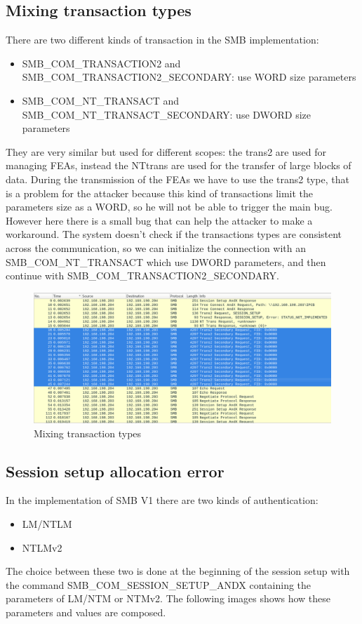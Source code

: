 \clearpage

\subsection{Mixing transaction types}
There are two different kinds of transaction in the SMB implementation:
\begin{itemize}
  \item SMB\_COM\_TRANSACTION2 and SMB\_COM\_TRANSACTION2\_SECONDARY: use WORD size parameters
  \item SMB\_COM\_NT\_TRANSACT and SMB\_COM\_NT\_TRANSACT\_SECONDARY: use DWORD size parameters
\end{itemize}
They are very similar but used for different scopes: the trans2 are used for managing FEAs, instead the NTtrans are used for the 
transfer of large blocks of data.
During the transmission of the FEAs we have to use the trans2 type, that is a problem for the attacker because this kind of transactions limit
the parameters size as a WORD, so he will not be able to trigger the main bug.
However here there is a small bug that can help the attacker to make a workaround. The system doesn't check if the transactions types are 
consistent across the communication, so we can initialize the connection with an SMB\_COM\_NT\_TRANSACT which use DWORD parameters, and then continue with SMB\_COM\_TRANSACTION2\_SECONDARY.

\begin{figure}[ht!]
  \centering
    \includegraphics[scale=0.35]{images/ws_trans2_requests.png}
    \caption{Mixing transaction types}
\end{figure}

\clearpage

\subsection{Session setup allocation error}
In the implementation of SMB V1 there are two kinds of authentication:
\begin{itemize}
  \item LM/NTLM
  \item NTLMv2
\end{itemize}
The choice between these two is done at the beginning of the session setup with the command
SMB\_COM\_SESSION\_SETUP\_ANDX containing the parameters of LM/NTM or NTMv2.
The following images shows how these parameters and values are composed.


